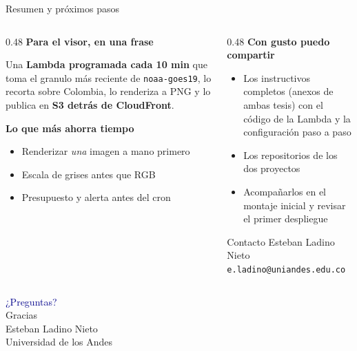 \documentclass[10pt,aspectratio=169]{beamer}
\begin{document}
\begin{frame}{Resumen y próximos pasos}
  \begin{columns}[T]
    \begin{column}{0.48\textwidth}
      \textbf{Para el visor, en una frase}
      \begin{block}{}
        \small
        Una \textbf{Lambda programada cada 10 min} que toma el granulo más
        reciente de \texttt{noaa-goes19}, lo recorta sobre Colombia, lo
        renderiza a PNG y lo publica en \textbf{S3 detrás de CloudFront}.
      \end{block}
      \vspace{0.2em}
      \textbf{Lo que más ahorra tiempo}
      \begin{itemize}\small
        \item Renderizar \emph{una} imagen a mano primero
        \item Escala de grises antes que RGB
        \item Presupuesto y alerta antes del cron
      \end{itemize}
    \end{column}
    \begin{column}{0.48\textwidth}
      \textbf{Con gusto puedo compartir}
      \begin{itemize}\small
        \item Los instructivos completos (anexos de ambas tesis) con el código
              de la Lambda y la configuración paso a paso
        \item Los repositorios de los dos proyectos
        \item Acompañarlos en el montaje inicial y revisar el primer
              despliegue
      \end{itemize}
      \vspace{0.5em}
      \begin{block}{Contacto}
        \small
        Esteban Ladino Nieto\\
        \texttt{e.ladino@uniandes.edu.co}
      \end{block}
    \end{column}
  \end{columns}
\end{frame}

\begin{frame}
  \begin{center}
    {\Huge \textcolor{darkblue}{¿Preguntas?}}\\[1.2em]
    {\large Gracias}\\[0.6em]
    \small Esteban Ladino Nieto \\
    \footnotesize Universidad de los Andes
  \end{center}
\end{frame}
\end{document}
